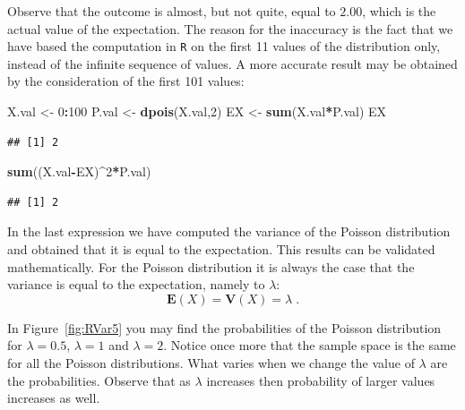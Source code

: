 \documentclass[]{krantz}
\makeatletter
\newenvironment{Shaded}{\begin{snugshade}}{\end{snugshade}}
\newcommand{\DecValTok}[1]{\textcolor[rgb]{0.00,0.00,0.81}{#1}}
\newcommand{\KeywordTok}[1]{\textcolor[rgb]{0.13,0.29,0.53}{\textbf{#1}}}
\newcommand{\NormalTok}[1]{#1}
\newcommand{\OperatorTok}[1]{\textcolor[rgb]{0.81,0.36,0.00}{\textbf{#1}}}
\newcommand{\StringTok}[1]{\textcolor[rgb]{0.31,0.60,0.02}{#1}}
\newcommand{\Expec}{\mathbf{E}}
\newcommand{\Var}{\mathbf{V}}
\newenvironment{kframe}{%
\medskip{}
\setlength{\fboxsep}{.8em}
 \def\at@end@of@kframe{}%
 \ifinner\ifhmode%
  \def\at@end@of@kframe{\end{minipage}}%
  \begin{minipage}{\columnwidth}%
 \fi\fi%
 \def\FrameCommand##1{\hskip\@totalleftmargin \hskip-\fboxsep
 \colorbox{shadecolor}{##1}\hskip-\fboxsep
     \hskip-\linewidth \hskip-\@totalleftmargin \hskip\columnwidth}%
 \MakeFramed {\advance\hsize-\width
   \@totalleftmargin\z@ \linewidth\hsize
   \@setminipage}}%
 {\par\unskip\endMakeFramed%
 \at@end@of@kframe}
\renewenvironment{Shaded}{\begin{kframe}}{\end{kframe}}
\theoremstyle{definition}
\theoremstyle{definition}
\theoremstyle{definition}
\theoremstyle{remark}
\makeatother
\begin{document}
Observe that the outcome is almost, but not quite, equal to \(2.00\),
which is the actual value of the expectation. The reason for the
inaccuracy is the fact that we have based the computation in \texttt{R} on the
first 11 values of the distribution only, instead of the infinite
sequence of values. A more accurate result may be obtained by the
consideration of the first 101 values:

\begin{Shaded}
\begin{Highlighting}[]
\NormalTok{X.val <-}\StringTok{ }\DecValTok{0}\OperatorTok{:}\DecValTok{100}
\NormalTok{P.val <-}\StringTok{ }\KeywordTok{dpois}\NormalTok{(X.val,}\DecValTok{2}\NormalTok{)}
\NormalTok{EX <-}\StringTok{ }\KeywordTok{sum}\NormalTok{(X.val}\OperatorTok{*}\NormalTok{P.val)}
\NormalTok{EX}
\end{Highlighting}
\end{Shaded}

\begin{verbatim}
## [1] 2
\end{verbatim}

\begin{Shaded}
\begin{Highlighting}[]
\KeywordTok{sum}\NormalTok{((X.val}\OperatorTok{-}\NormalTok{EX)}\OperatorTok{^}\DecValTok{2}\OperatorTok{*}\NormalTok{P.val)}
\end{Highlighting}
\end{Shaded}

\begin{verbatim}
## [1] 2
\end{verbatim}

In the last expression we have computed the variance of the Poisson
distribution and obtained that it is equal to the expectation. This
results can be validated mathematically. For the Poisson distribution it
is always the case that the variance is equal to the expectation, namely
to \(\lambda\): \[\Expec(X) = \Var(X) = \lambda\;.\]

In Figure~\ref{fig:RVar5} you may find the probabilities of the
Poisson distribution for \(\lambda = 0.5\), \(\lambda = 1\) and
\(\lambda = 2\). Notice once more that the sample space is the same for
all the Poisson distributions. What varies when we change the value of
\(\lambda\) are the probabilities. Observe that as \(\lambda\) increases
then probability of larger values increases as well.
\end{document}
